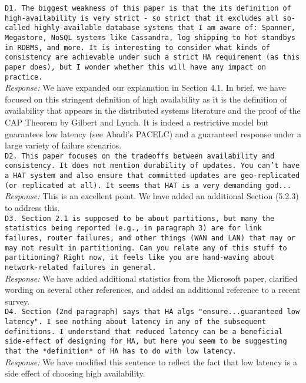 \documentclass[10pt]{article}
\newcommand{\reviewer}[1] {\noindent\texttt{#1}\\}
\newcommand{\response}[1] {\noindent\textit{Response: } #1\\}
\begin{document}
\reviewer{D1. The biggest weakness of this paper is that the its definition of high-availability is very strict - so strict that it excludes all so-called highly-available database systems that I am aware of: Spanner, Megastore, NoSQL systems like Cassandra, log shipping to hot standbys in RDBMS, and more. It is interesting to consider what kinds of consistency are achievable under such a strict HA requirement (as this paper does), but I wonder whether this will have any impact on practice.}

\response{We have expanded our explanation in Section 4.1. In brief, we have
focused on this stringent definition of high availability as it is the
definition of availability that appears in the distributed systems
literature and the proof of the CAP Theorem by Gilbert and Lynch. It
is indeed a restrictive model but guarantees low latency (see Abadi's
PACELC) and a guaranteed response under a large variety of failure
scenarios.}

\reviewer{D2. This paper focuses on the tradeoffs between availability and consistency. It does not mention durability of updates. You can't have a HAT system and also ensure that committed updates are geo-replicated (or replicated at all). It seems that HAT is a very demanding god... }

\response{This is an excellent point. We have added an additional Section
(5.2.3) to address this.}

\reviewer{D3. Section 2.1 is supposed to be about partitions, but many the
statistics being reported (e.g., in paragraph 3) are for link
failures, router failures, and other things (WAN and LAN) that may or
may not result in partitioning. Can you relate any of this stuff to
partitioning? Right now, it feels like you are hand-waving about
network-related failures in general.}

\response{We have added additional
statistics from the Microsoft paper, clarified wording on several
other references, and added an additional reference to a recent
survey.}

\reviewer{D4. Section (2nd paragraph) says that HA algs "ensure...guaranteed low latency". I see nothing about latency in any of the subsequent definitions. I understand that reduced latency can be a beneficial side-effect of designing for HA, but here you seem to be suggesting that the *definition* of HA has to do with low latency.}

\response{We have modified this sentence to reflect the fact that low latency is
a side effect of choosing high availability.}
\end{document}
